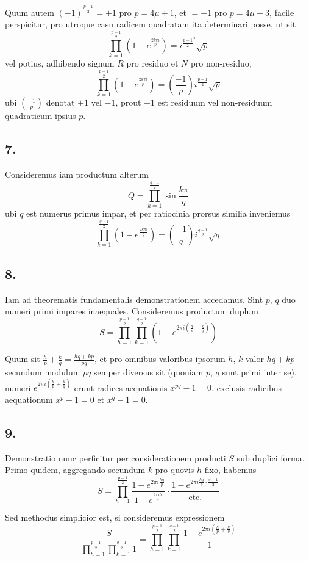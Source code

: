 \documentclass[12pt,a4paper]{article}
\theoremstyle{plain}
\theoremstyle{definition}
\theoremstyle{remark}
\begin{document}
Quum autem $(-1)^{\frac{p-1}{2}} = +1$ pro $p=4\mu+1$, et $=-1$ pro $p=4\mu+3$, facile perspicitur, pro utroque casu radicem quadratam ita determinari posse, ut sit
\[\prod_{k=1}^{\frac{p-1}{2}}(1-e^{\frac{2k\pi i}{p}}) = i^{\frac{p-1}{2}^2} \sqrt{p}\]
vel potius, adhibendo signum $R$ pro residuo et $N$ pro non-residuo,
\[\prod_{k=1}^{\frac{p-1}{2}}(1-e^{\frac{2k\pi i}{p}}) = \left(\frac{-1}{p}\right) i^{\frac{p-1}{2}} \sqrt{p}\]
ubi $\left(\frac{-1}{p}\right)$ denotat $+1$ vel $-1$, prout $-1$ est residuum vel non-residuum quadraticum ipsius $p$.


\newpage
\subsection*{7.}
Consideremus iam productum alterum
\[Q = \prod_{k=1}^{\frac{q-1}{2}} \sin\frac{k\pi}{q}\]
ubi $q$ est numerus primus impar, et per ratiocinia prorsus similia inveniemus
\[\prod_{k=1}^{\frac{q-1}{2}}(1-e^{\frac{2k\pi i}{q}}) = \left(\frac{-1}{q}\right) i^{\frac{q-1}{2}} \sqrt{q}\]

\subsection*{8.}
Iam ad theorematis fundamentalis demonstrationem accedamus. Sint $p$, $q$ duo numeri primi impares inaequales. Consideremus productum duplum
\[S = \prod_{h=1}^{\frac{p-1}{2}} \prod_{k=1}^{\frac{q-1}{2}} \left(1 - e^{2\pi i(\frac{h}{p}+\frac{k}{q})}\right)\]

Quum sit $\frac{h}{p}+\frac{k}{q} = \frac{hq+kp}{pq}$, et pro omnibus valoribus ipsorum $h$, $k$ valor $hq+kp$ secundum modulum $pq$ semper diversus sit (quoniam $p$, $q$ sunt primi inter se), numeri $e^{2\pi i(\frac{h}{p}+\frac{k}{q})}$ erunt radices aequationis $x^{pq}-1=0$, exclusis radicibus aequationum $x^p-1=0$ et $x^q-1=0$.

\subsection*{9.}
Demonstratio nunc perficitur per considerationem producti $S$ sub duplici forma. Primo quidem, aggregando secundum $k$ pro quovis $h$ fixo, habemus
\[S = \prod_{h=1}^{\frac{p-1}{2}} \frac{1-e^{2\pi i\frac{hq}{p}}}{1-e^{\frac{2\pi ih}{p}}} \cdot \frac{1-e^{2\pi i\frac{hq}{p}\cdot\frac{q+1}{2}}}{\text{etc.}}\]

Sed methodus simplicior est, si consideremus expressionem
\[\frac{S}{\prod_{h=1}^{\frac{p-1}{2}}\prod_{k=1}^{\frac{q-1}{2}} 1} = \prod_{h=1}^{\frac{p-1}{2}}\prod_{k=1}^{\frac{q-1}{2}} \frac{1-e^{2\pi i(\frac{h}{p}+\frac{k}{q})}}{1}\]
\end{document}
